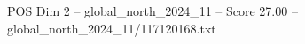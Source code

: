 \begin{textsample}{POS Dim 2 – global\_north\_2024\_11 – Score 27.00 – global\_north\_2024\_11/117120168.txt}
\end{textsample}
